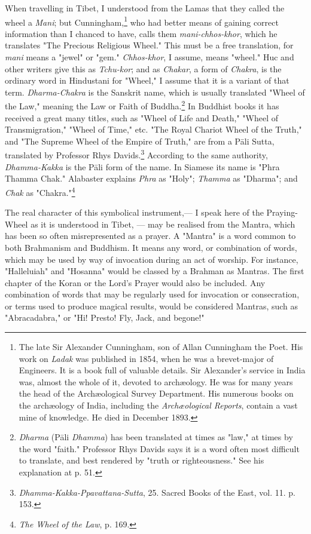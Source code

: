 \documentclass[a4paper, 11pt, oneside, polutonikogreek, english]{article}
\begin{document}
When travelling in Tibet, I understood from the Lamas that they called the wheel a \emph{Mani}; but Cunningham,\footnote{The late Sir Alexander Cunningham, son of Allan Cunningham the Poet. His work on \emph{Ladak} was published in 1854, when he was a brevet-major of Engineers. It is a book full of valuable details. Sir Alexander's service in India was, almost the whole of it, devoted to archæology. He was for many years the head of the Archæological Survey Department. His numerous books on the archæology of India, including the \emph{Archæological Reports}, contain a vast mine of knowledge. He died in December 1893.} who had better means of gaining correct information than I chanced to have, calls them \emph{mani-chhos-khor}, which he translates "The Precious Religious Wheel." This must be a free translation, for \emph{mani} means a "jewel" or "gem." \emph{Chhos-khor}, I assume, means "wheel." Huc and other writers give this as \emph{Tchu-kor}; and as \emph{Chakar}, a form of \emph{Chakra}, is the ordinary word in Hindustani for "Wheel," I assume that it is a variant of that term. \emph{Dharma-Chakra} is the Sanskrit name, which is usually translated "Wheel of the Law," meaning the Law or Faith of Buddha.\footnote{\emph{Dharma} (Pāli \emph{Dhamma}) has been translated at times as "law," at times by the word "faith." Professor Rhys Davids says it is a word often most difficult to translate, and best rendered by "truth or righteousness." See his explanation at p. 51.} In Buddhist books it has received a great many titles, such as "Wheel of Life and Death," "Wheel of Transmigration," "Wheel of Time," etc. "The Royal Chariot Wheel of the Truth," and "The Supreme Wheel of the Empire of Truth," are from a Pāli Sutta, translated by Professor Rhys Davids.\footnote{\emph{Dhamma-Kakka-Ppavattana-Sutta}, 25. Sacred Books of the East, vol. 11. p. 153.} According to the same authority, \emph{Dhamma-Kakka} is the Pāli form of the name. In Siamese its name is "Phra Thamma Chak." Alabaster explains \emph{Phra} as "Holy"; \emph{Thamma} as "Dharma"; and \emph{Chak} as "Chakra."\footnote{\emph{The Wheel of the Law}, p. 169.}

The real character of this symbolical instrument,--- I speak here of the Praying-Wheel as it is understood in Tibet, --- may be realised from the Mantra, which has been so often misrepresented as a prayer. A "Mantra" is a word common to both Brahmanism and Buddhism. It means any word, or combination of words, which may be used by way of invocation during an act of worship. For instance, "Halleluiah" and "Hosanna" would be classed by a Brahman as Mantras. The first chapter of the Koran or the Lord's Prayer would also be included. Any combination of words that may be regularly used for invocation or consecration, or terms used to produce magical results, would be considered Mantras, such as "Abracadabra," or "Hi! Presto! Fly, Jack, and begone!"
\end{document}
